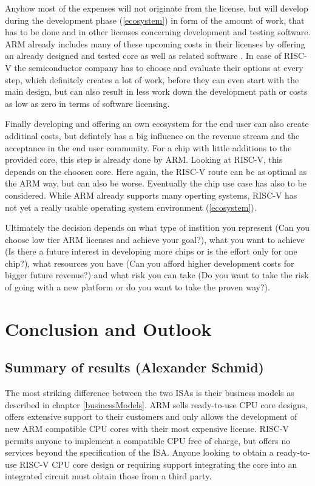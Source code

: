 \documentclass[conference]{IEEEtran}
\begin{document}
	Anyhow most of the expenses will not originate from the license, but will develop during the development phase (\ref{ecosystem}) in form of the amount of work, that has to be done and in other licenses concerning development and testing software. ARM already includes many of these upcoming costs in their licenses by offering an already designed and tested core as well as related software \cite{ARM2019}. In case of RISC-V the semiconductor company has to choose and evaluate their options at every step, which definitely creates a lot of work, before they can even start with the main design, but can also result in less work down the development path or costs as low as zero in terms of software licensing.

	Finally developing and offering an own ecosystem for the end user can also create additinal costs, but defintely has a big influence on the revenue stream and the acceptance in the end user community. For a chip with little additions to the provided core, this step is already done by ARM. Looking at RISC-V, this depends on the choosen core. Here again, the RISC-V route can be as optimal as the ARM way, but can also be worse. Eventually the chip use case has also to be considered. While ARM already supports many operting systems, RISC-V has not yet a really usable operating system environment (\ref{ecosystem}).

	Ultimately the decision depends on what type of instition you represent (Can you choose low tier ARM licenses and achieve your goal?), what you want to achieve (Is there a future interest in developing more chips or is the effort only for one chip?), what resources you have (Can you afford higher development costs for bigger future revenue?) and what risk you can take (Do you want to take the risk of going with a new platform or do you want to take the proven way?).


\section{Conclusion and Outlook}
\label{ref:conclusion}
	\subsection{Summary of results (Alexander Schmid)}
	The most striking difference between the two \glspl{ISA} is their business models as described in chapter \ref{businessModels}.
	ARM sells ready-to-use \gls{CPU} core designs, offers extensive support to their customers and only allows the development of new
	ARM compatible \gls{CPU} cores with their most expensive license.
	RISC-V permits anyone to implement a compatible \gls{CPU} free of charge, but offers no services beyond the specification of the \gls{ISA}.
	Anyone looking to obtain a ready-to-use RISC-V \gls{CPU} core design or requiring support integrating the core into an integrated circuit
	must obtain those from a third party.
\end{document}
